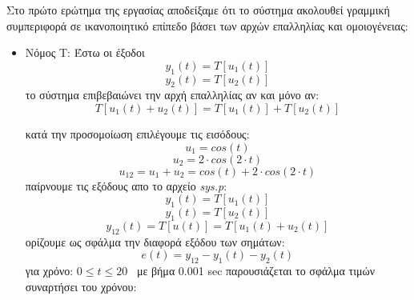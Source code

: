 \documentclass{article}
\begin{document}
Στο πρώτο ερώτημα της εργασίας αποδείξαμε ότι το σύστημα ακολουθεί γραμμική συμπεριφορά σε ικανοποιητικό επίπεδο βάσει των αρχών επαλληλίας και ομοιογένειας: \newline
\begin{itemize}
    \item Νόμος Τ: Έστω οι έξοδοι 
    \begin{equation*}
    y_1(t) = T\left[u_1(t)\right]
    \end{equation*}
    \begin{equation*}
    y_2(t) = T\left[u_2(t)\right]
    \end{equation*}
    το σύστημα επιβεβαιώνει την αρχή επαλληλίας αν και μόνο αν: 
    \begin{equation*}
    T\left[u_1(t) + u_2(t)\right] = T\left[u_1(t)\right] + T\left[u_2(t)\right]
    \end{equation*}

    κατά την προσομοίωση επιλέγουμε τις εισόδους: 
    \begin{equation*}
    \boxed{
    u_1 = cos(t)
    }
    \end{equation*}
    \begin{equation*}
    \boxed{
    u_2 = 2 \cdot cos(2 \cdot t)
    }
    \end{equation*}
    \begin{equation*}
    \boxed{
    u_{12} = u_1 + u_2 = cos(t) + 2 \cdot cos(2 \cdot t)
    }
    \end{equation*}
    παίρνουμε τις εξόδους απο το αρχείο \textit{sys.p}:
    \begin{equation*}
    \boxed{
    y_1(t) = T\left[u_1(t)\right]
    }
    \end{equation*}
    \begin{equation*}
    \boxed{
    y_1(t) = T\left[u_2(t)\right]
    }
    \end{equation*}
    \begin{equation*}
    \boxed{
    y_{12}(t) = T\left[u(t)\right] = T\left[u_1(t) + u_2(t)\right]
    }
    \end{equation*}
    ορίζουμε ως σφάλμα την διαφορά εξόδου των σημάτων:
    \begin{equation*}
    e(t) = y_{12} - y_1(t) -y_2(t)
    \end{equation*}
    για χρόνο:  $ 0 \leq t \leq 20 \enspace$   με βήμα 0.001 sec παρουσιάζεται το σφάλμα τιμών συναρτήσει του χρόνου: 
    

\end{itemize}
\end{document}
